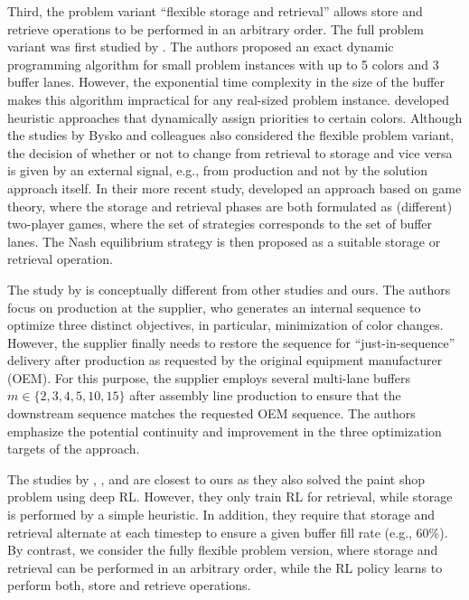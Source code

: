 \documentclass[11pt]{elsarticle}
\newcommand{\blackversion}{ }
\newcommand{\blackorcolor}{
\ifdefined\blackversion
	\color{black}
\fi
}
\newcommand{\REV}[1]{{\color{myblue}\blackorcolor #1}}
\begin{document}
\vspace{-0.1cm}




Third, the problem variant ``flexible storage and retrieval'' allows store and retrieve operations to be performed in an arbitrary order. The full problem variant was first studied by \cite{Epping.2003}. The authors proposed an exact dynamic programming algorithm for small problem instances with up to 5 colors and 3 buffer lanes. However, the exponential time complexity in the size of the buffer makes this algorithm impractical for any real-sized problem instance. \citet{Bysko.2020} developed heuristic approaches that dynamically assign priorities to certain colors. Although the studies by Bysko and colleagues also considered the flexible problem variant, the decision of whether or not to change from retrieval to storage and vice versa is given by an external signal, e.g., from production and not by the solution approach itself. In their more recent study, \citet{Bysko.2024} developed an approach based on game theory, where the storage and retrieval phases are both formulated as (different) two-player games, where the set of strategies corresponds to the set of buffer lanes. The Nash equilibrium strategy is then proposed as a suitable storage or retrieval operation.


The study by \citet{taube2018resequencing} is conceptually different from other studies and ours. The authors focus on production at the supplier, who generates an internal sequence to optimize three distinct objectives, in particular, minimization of color changes. However, the supplier finally needs to restore the sequence for ``just-in-sequence'' delivery after production as requested by the original equipment manufacturer (OEM). \REV{For this purpose, the supplier employs several multi-lane buffers $m \in \lbrace 2,3,4,5, 10,15 \rbrace$ after assembly line production to ensure that the downstream sequence matches the requested OEM sequence.} The authors emphasize the potential continuity and improvement in the three optimization targets of the approach.




The studies by \citet{Leng.2020}, \citet{Leng.2023}, and \citet{Huang.2024} are closest to ours as they also solved the paint shop problem using deep RL. However, they only train RL for retrieval, while storage is performed by a simple heuristic. In addition, they require that storage and retrieval alternate at each timestep to ensure a given buffer fill rate (e.g., 60\%). By contrast, we consider the fully flexible problem version, where storage and retrieval can be performed in an arbitrary order, while the RL policy learns to perform both, store and retrieve operations.
\end{document}
